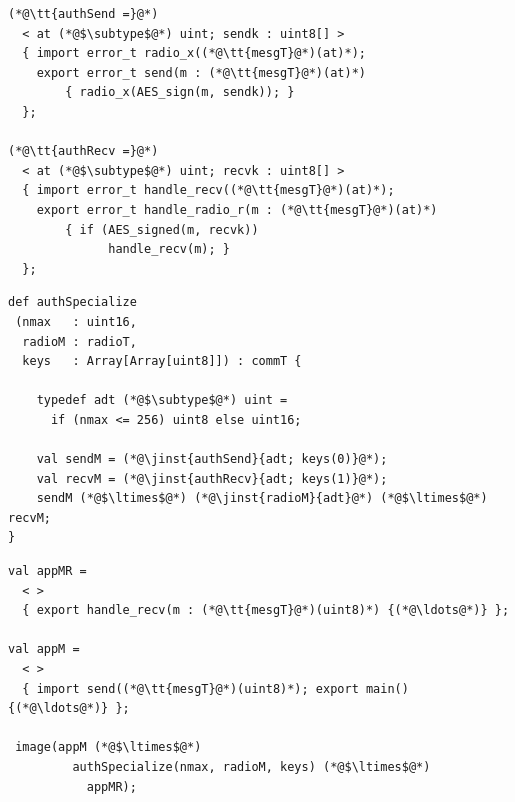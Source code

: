
\begin{lstlisting}[language=nesC]
(*@\tt{authSend =}@*)
  < at (*@$\subtype$@*) uint; sendk : uint8[] >  
  { import error_t radio_x((*@\tt{mesgT}@*)(at)*);
    export error_t send(m : (*@\tt{mesgT}@*)(at)*) 
        { radio_x(AES_sign(m, sendk)); }
  };

(*@\tt{authRecv =}@*)
  < at (*@$\subtype$@*) uint; recvk : uint8[] >  
  { import error_t handle_recv((*@\tt{mesgT}@*)(at)*);
    export error_t handle_radio_r(m : (*@\tt{mesgT}@*)(at)*) 
        { if (AES_signed(m, recvk))
              handle_recv(m); }
  };
\end{lstlisting}
\stopslide


\begin{lstlisting}[language=scalaness]
def authSpecialize
 (nmax   : uint16,
  radioM : radioT,
  keys   : Array[Array[uint8]]) : commT {

    typedef adt (*@$\subtype$@*) uint =
      if (nmax <= 256) uint8 else uint16;

    val sendM = (*@\jinst{authSend}{adt; keys(0)}@*);
    val recvM = (*@\jinst{authRecv}{adt; keys(1)}@*);
    sendM (*@$\ltimes$@*) (*@\jinst{radioM}{adt}@*) (*@$\ltimes$@*) recvM;
}
\end{lstlisting}
\stopslide


\begin{lstlisting}[language=scalaness]
val appMR =
  < >
  { export handle_recv(m : (*@\tt{mesgT}@*)(uint8)*) {(*@\ldots@*)} }; 

val appM = 
  < >
  { import send((*@\tt{mesgT}@*)(uint8)*); export main() {(*@\ldots@*)} };  

 image(appM (*@$\ltimes$@*)
         authSpecialize(nmax, radioM, keys) (*@$\ltimes$@*)
           appMR);
\end{lstlisting}
\stopslide

%
%

